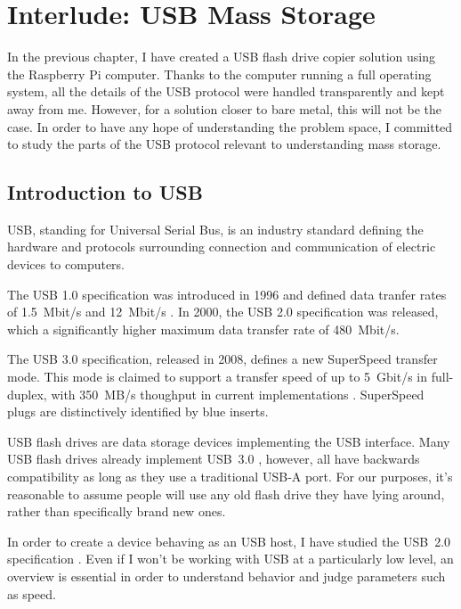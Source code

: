 \chapter{Interlude: USB Mass Storage}
    In the previous chapter, I have created a USB flash drive copier solution using the Raspberry Pi computer.  Thanks to the computer running a full operating system, all the details of the USB protocol were handled transparently and kept away from me.  However, for a solution closer to bare metal, this will not be the case.  In order to have any hope of understanding the problem space, I committed to study the parts of the USB protocol relevant to understanding mass storage.
    
    \section{Introduction to USB}
    
    USB, standing for Universal Serial Bus, is an industry standard defining the hardware and protocols surrounding connection and communication of electric devices to computers.  
    
    The USB 1.0 specification was introduced in 1996 and defined data tranfer rates of 1.5~Mbit/s and 12~Mbit/s \cite{hui1394}.   In 2000, the USB 2.0 specification was released, which a significantly higher maximum data transfer rate of 480~Mbit/s.
    
    The USB 3.0 specification, released in 2008, defines a new SuperSpeed transfer mode.  This mode is claimed to support a transfer speed of up to 5~Gbit/s in full-duplex, with 350~MB/s thoughput in current implementations \cite{usb-3-hp}.  SuperSpeed plugs are distinctively identified by blue inserts. 
    
    USB flash drives are data storage devices implementing the USB interface.  Many USB flash drives already implement USB~3.0 \cite{wirecutter-best-usb-3-0}, however, all have backwards compatibility as long as they use a traditional USB‑A port.  For our purposes, it's reasonable to assume people will use any old flash drive they have lying around, rather than specifically brand new ones.
    
    In order to create a device behaving as an USB host, I have studied the USB~2.0 specification .  Even if I won't be working with USB at a particularly low level, an overview is essential in order to understand behavior and judge parameters such as speed.
    
